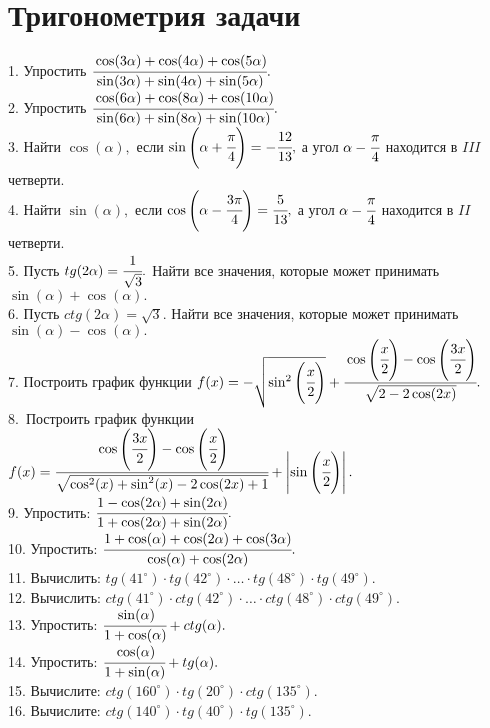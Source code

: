 \section{Тригонометрия задачи}
1. Упростить $\cfrac{\cos(3\alpha)+\cos(4\alpha)+\cos(5\alpha)}{\sin(3\alpha)+\sin(4\alpha)+\sin(5\alpha)}.$\\
2. Упростить $\cfrac{\cos(6\alpha)+\cos(8\alpha)+\cos(10\alpha)}{\sin(6\alpha)+\sin(8\alpha)+\sin(10\alpha)}.$\\
3. Найти $\cos(\alpha),$ если $\sin\left(\alpha+\cfrac{\pi}{4}\right)=-\cfrac{12}{13},$ а угол $\alpha-\cfrac{\pi}{4}$ находится в $III$ четверти.\\
4. Найти $\sin(\alpha),$ если $\cos\left(\alpha-\cfrac{3\pi}{4}\right)=\cfrac{5}{13},$ а угол $\alpha-\cfrac{\pi}{4}$ находится в $II$ четверти.\\
5. Пусть $tg(2\alpha)=\cfrac{1}{\sqrt{3}}.$ Найти все значения, которые может принимать $\sin(\alpha)+\cos(\alpha).$\\
6. Пусть $ctg(2\alpha)=\sqrt{3}.$ Найти все значения, которые может принимать $\sin(\alpha)-\cos(\alpha).$\\
7. Построить график функции $f(x)=-\sqrt{\sin^2\left(\cfrac{x}{2}\right)}+\cfrac{\cos\left(\cfrac{x}{2}\right)-\cos\left(\cfrac{3x}{2}\right)}
{\sqrt{2-2\cos(2x)}}.$\\
8.\ Построить график функции $f(x)=\cfrac{\cos\left(\cfrac{3x}{2}\right)-\cos\left(\cfrac{x}{2}\right)}
{\sqrt{\cos^2(x)+\sin^2(x)-2\cos(2x)+1}}+\left|\sin\left(\cfrac{x}{2}\right)\right|.$\\
9. Упростить: $\cfrac{1-\cos(2\alpha)+\sin(2\alpha)}{1+\cos(2\alpha)+\sin(2\alpha)}.$\\
10. Упростить: $\cfrac{1+\cos(\alpha)+\cos(2\alpha)+\cos(3\alpha)}{\cos(\alpha)+\cos(2\alpha)}.$\\
11. Вычислить: $tg(41^\circ)\cdot tg(42^\circ)\cdot \ldots \cdot tg(48^\circ)\cdot tg(49^\circ).$\\
12. Вычислить: $ctg(41^\circ)\cdot ctg(42^\circ)\cdot \ldots \cdot ctg(48^\circ)\cdot ctg(49^\circ).$\\
13. Упростить: $\cfrac{\sin(\alpha)}{1+\cos(\alpha)}+ctg(\alpha).$\\
14. Упростить: $\cfrac{\cos(\alpha)}{1+\sin(\alpha)}+tg(\alpha).$\\
15. Вычислите: $ctg(160^\circ)\cdot tg(20^\circ)\cdot ctg(135^\circ).$\\
16. Вычислите: $ctg(140^\circ)\cdot tg(40^\circ)\cdot tg(135^\circ).$\\
